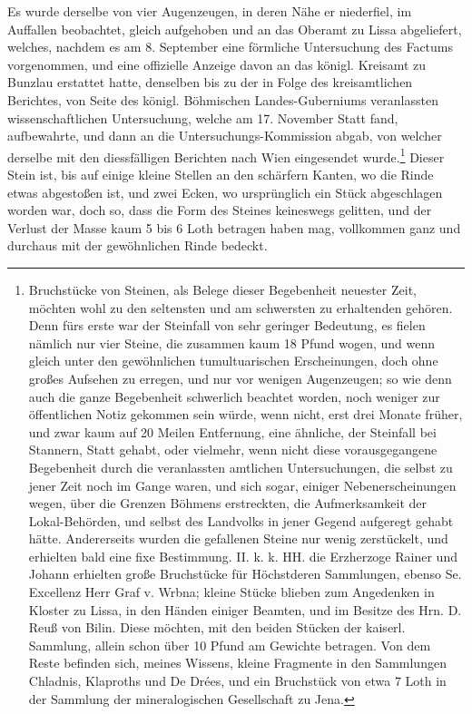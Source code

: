 \documentclass[a4paper, 11pt, oneside, german]{article}
\begin{document}
Es wurde derselbe von vier Augenzeugen, in deren Nähe er niederfiel, im Auffallen beobachtet, gleich aufgehoben und an das Oberamt zu Lissa abgeliefert, welches, nachdem es am 8. September eine förmliche Untersuchung des Factums vorgenommen, und eine offizielle Anzeige davon an das königl. Kreisamt zu Bunzlau erstattet hatte, denselben bis zu der in Folge des kreisamtlichen Berichtes, von Seite des königl. Böhmischen Landes-Guberniums veranlassten wissenschaftlichen Untersuchung, welche am 17. November Statt fand, aufbewahrte, und dann an die Untersuchungs-Kommission abgab, von welcher derselbe mit den diessfälligen Berichten nach Wien eingesendet wurde.\footnote{Bruchstücke von Steinen, als Belege dieser Begebenheit neuester Zeit, möchten wohl zu den seltensten und am schwersten zu erhaltenden gehören. Denn fürs erste war der Steinfall von sehr geringer Bedeutung, es fielen nämlich nur vier Steine, die zusammen kaum 18 Pfund wogen, und wenn gleich unter den gewöhnlichen tumultuarischen Erscheinungen, doch ohne großes Aufsehen zu erregen, und nur vor wenigen Augenzeugen; so wie denn auch die ganze Begebenheit schwerlich beachtet worden, noch weniger zur öffentlichen Notiz gekommen sein würde, wenn nicht, erst drei Monate früher, und zwar kaum auf 20 Meilen Entfernung, eine ähnliche, der Steinfall bei Stannern, Statt gehabt, oder vielmehr, wenn nicht diese vorausgegangene Begebenheit durch die veranlassten amtlichen Untersuchungen, die selbst zu jener Zeit noch im Gange waren, und sich sogar, einiger Nebenerscheinungen wegen, über die Grenzen Böhmens erstreckten, die Aufmerksamkeit der Lokal-Behörden, und selbst des Landvolks in jener Gegend aufgeregt gehabt hätte. Andererseits wurden die gefallenen Steine nur wenig zerstückelt, und erhielten bald eine fixe Bestimmung. II. k. k. HH. die Erzherzoge Rainer und Johann erhielten große Bruchstücke für Höchstderen Sammlungen, ebenso Se. Excellenz Herr Graf v. Wrbna; kleine Stücke blieben zum Angedenken in Kloster zu Lissa, in den Händen einiger Beamten, und im Besitze des Hrn. D. Reuß von Bilin. Diese möchten, mit den beiden Stücken der kaiserl. Sammlung, allein schon über 10 Pfund am Gewichte betragen. Von dem Reste befinden sich, meines Wissens, kleine Fragmente in den Sammlungen Chladnis, Klaproths und De Drées, und ein Bruchstück von etwa 7 Loth in der Sammlung der mineralogischen Gesellschaft zu Jena.} Dieser Stein ist, bis auf einige kleine Stellen an den schärfern Kanten, wo die Rinde etwas abgestoßen ist, und zwei Ecken, wo ursprünglich ein Stück abgeschlagen worden war, doch so, dass die Form des Steines keineswegs gelitten, und der Verlust der Masse kaum 5 bis 6 Loth betragen haben mag, vollkommen ganz und durchaus mit der gewöhnlichen Rinde bedeckt.
\end{document}
